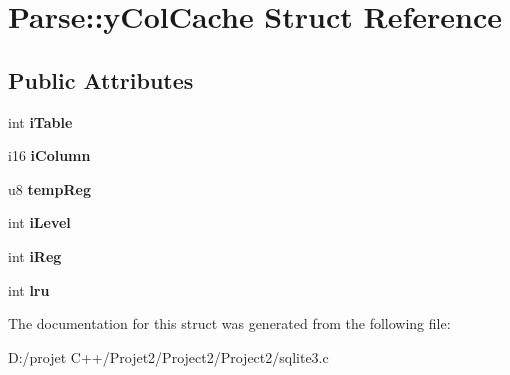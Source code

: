 \hypertarget{struct_parse_1_1y_col_cache}{}\section{Parse\+:\+:y\+Col\+Cache Struct Reference}
\label{struct_parse_1_1y_col_cache}
\subsection*{Public Attributes}
\begin{DoxyCompactItemize}
\item 
\mbox{\label{struct_parse_1_1y_col_cache_a7d99a4e00555cb0ff7fb3990bb7b549e}} 
int {\bfseries i\+Table}
\item 
\mbox{\label{struct_parse_1_1y_col_cache_a61384f3e70790b1e3058eae8b893fbb9}} 
i16 {\bfseries i\+Column}
\item 
\mbox{\label{struct_parse_1_1y_col_cache_a61561cab1ce2e1914083777ae84c8fe8}} 
u8 {\bfseries temp\+Reg}
\item 
\mbox{\label{struct_parse_1_1y_col_cache_a656ea77cf538db00249221de58fd9066}} 
int {\bfseries i\+Level}
\item 
\mbox{\label{struct_parse_1_1y_col_cache_aadb47e545234142bd1e9ca4803953ab0}} 
int {\bfseries i\+Reg}
\item 
\mbox{\label{struct_parse_1_1y_col_cache_ac163bb2b692f3037054f92294322f999}} 
int {\bfseries lru}
\end{DoxyCompactItemize}


The documentation for this struct was generated from the following file\+:\begin{DoxyCompactItemize}
\item 
D\+:/projet C++/\+Projet2/\+Project2/\+Project2/sqlite3.\+c\end{DoxyCompactItemize}
